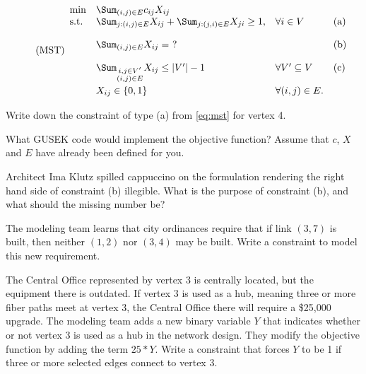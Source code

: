 \begin{equation}
  \label{eq:mst}
  \tag{MST}
  \begin{array}{llll}
    \min & \Sum_{(i,j)\in E} c_{ij} X_{ij} & & \\
    \mbox{s.t.} & \Sum_{j:(i,j) \in E} X_{ij} + 
    \Sum_{j:(j,i) \in E} X_{ji} \geq 1, & \forall i \in V &
    \mbox{(a)} \\[4mm]
    & \Sum_{(i,j) \in E} X_{ij} = ~? & & \mbox{(b)} \\[4mm]
    & \Sum_{\substack{i,j \in V' \\ (i,j) \in E}} X_{ij} \leq |V'| - 1 & \forall V' \subseteq V & \mbox{(c)} \\[4mm]
    & X_{ij} \in \{0,1\} & \forall (i,j) \in E. &
  \end{array}
\end{equation}



\begin{parts}
  
 Write down the constraint of type (a) from \eqref{eq:mst} for vertex 4.

\vfill

 What GUSEK code would implement the objective function? Assume that $c$, $X$ and $E$ have already been defined for you.  

\vfill

\newpage

 Architect Ima Klutz spilled cappuccino on the formulation rendering the right hand side of constraint (b) illegible.  What is the purpose of constraint (b), and what should the missing number be?

\vfill

 The modeling team learns that city ordinances require that if link $(3,7)$ is built, then neither $(1,2)$ nor $(3,4)$ may be built.  Write a constraint to model this new requirement.


\vfill

 The Central Office represented by vertex 3 is centrally located, but the equipment there is outdated.  If vertex 3 is used as a hub, meaning three or more fiber paths meet at vertex 3, the Central Office there will require a \$25,000 upgrade.  The modeling team adds a new binary variable $Y$ that indicates whether or not vertex 3 is used as a hub in the network design.  They modify the objective function by adding the term $25*Y$.  Write a constraint that forces $Y$ to be 1 if three or more selected edges connect to vertex 3.

\vfill

\end{parts}

